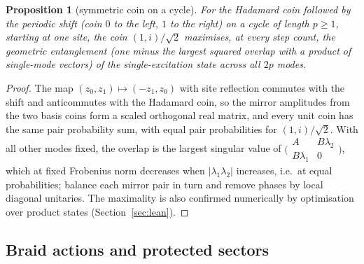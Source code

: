 \documentclass[aps,pra,onecolumn,superscriptaddress,nofootinbib,10pt]{revtex4-2}
\newtheorem{proposition}[theorem]{Proposition}
\theoremstyle{definition}
\theoremstyle{remark}
\begin{document}
\begin{proposition}[symmetric coin on a cycle]\label{prop:cpcoin}
For the Hadamard coin followed by the periodic shift (coin $0$ to the left, $1$ to the right) on a cycle of length $p\ge1$, starting at one
site, the coin $(1,i)/\sqrt2$ maximises, at every step count, the geometric entanglement (one minus the largest squared overlap with a
product of single-mode vectors) of the single-excitation state across all $2p$ modes.
\end{proposition}
\begin{proof}
The map $(z_0,z_1)\mapsto(-z_1,z_0)$ with site reflection commutes with the shift and anticommutes with the Hadamard coin, so the mirror
amplitudes from the two basis coins form a scaled orthogonal real matrix, and every unit coin has the same pair probability sum, with
equal pair probabilities for $(1,i)/\sqrt2$.  With all other modes fixed, the overlap is the largest singular value of
$\bigl(\begin{smallmatrix}A&B\lambda_2\\ B\lambda_1&0\end{smallmatrix}\bigr)$, which at fixed Frobenius norm decreases when $\lvert\lambda_1\lambda_2\rvert$ increases, i.e.\ at equal probabilities; balance each
mirror pair in turn and remove phases by local diagonal unitaries.  The maximality is also confirmed numerically by
optimisation over product states (Section~\ref{sec:lean}).
\end{proof}

\subsection{Braid actions and protected sectors}
\end{document}
